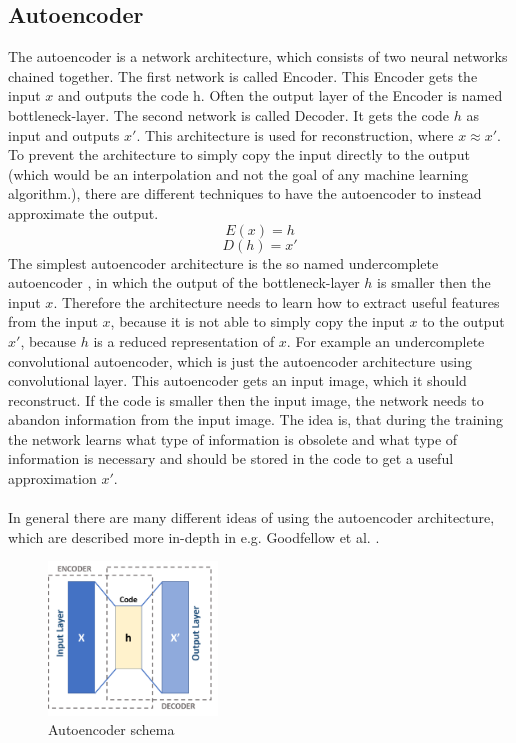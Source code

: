  \subsection{Autoencoder} \label{subsection::autoencoder}
  The autoencoder is a network architecture, which consists of two neural networks chained together. The first network is called Encoder. This Encoder gets the input $x$ and outputs
  the code h. Often the output layer of the Encoder is named bottleneck-layer. The second network is called Decoder. It gets the code $h$ as input
  and outputs $x \prime$. This architecture is used for reconstruction, where $x \approx x \prime$. To prevent the architecture to simply copy the input directly to the output (which would be an
  interpolation and not the goal of any machine learning algorithm.), there are different techniques to have the autoencoder to instead approximate the output.
  \begin{equation}
   E(x) = h
  \end{equation}
  \begin{equation}
   D(h) = x \prime
  \end{equation}
  The simplest autoencoder architecture is the so named undercomplete autoencoder \cite{Goodfellow2016}, in which the output of the bottleneck-layer $h$ is smaller then the input $x$.
  Therefore the architecture needs to learn how to extract useful features from the input $x$, because it is not able to simply copy the input $x$ to the output $x \prime$, because $h$ is a reduced
  representation of $x$.
  For example an undercomplete convolutional autoencoder, which is just the autoencoder architecture using convolutional layer. This autoencoder gets an input 
  image, which it should reconstruct.
  If the code is smaller then the input image, the network needs to abandon information from the input image. The idea is, that during the training the network 
  learns
  what type of information is obsolete and what type of information is necessary and should be stored in the code to get a useful approximation $x \prime$.
  \\\\ 
  In general there are many different ideas of using the autoencoder architecture, which are described more in-depth in e.g. Goodfellow et al. \cite{Goodfellow2016}.
  \begin{figure}[H]
   \includegraphics[width=0.4\textwidth]{../Images/autoencoder_schema.png}
   \centering
   \caption{Autoencoder schema \cite{wiki2019}}
   \label{fig:lstm_architecture}
  \end{figure}
  
